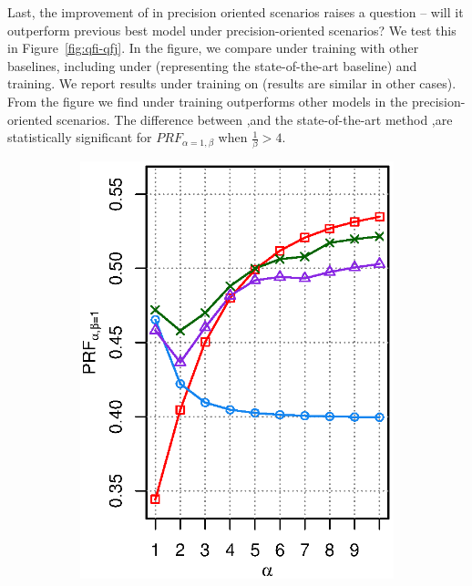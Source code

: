 Last, the improvement of \QFJ in precision oriented scenarios raises a question -- will it outperform previous best model \QFI under precision-oriented scenarios? We test this in Figure~\ref{fig:qfi-qfj}. In the figure, we compare \QFJ under \EUM training with other baselines, including \QFI under \MLE (representing the state-of-the-art baseline) and \EUM training. We report results under  training on \DQF (results are similar in other cases). From the figure we find \QFJ under \EUM training outperforms other models in the precision-oriented scenarios. The difference between \QFJ,\EUM and the state-of-the-art method \QFI,\MLE are statistically significant for $P\!R\!F_{\alpha=1,\beta}$ when $\frac{1}{\beta}>4$.
\begin{figure}[ht!]
\centering
\caption{\PRF performance with different $\alpha$, $\beta$ settings for \QFI and \QFJ under \MLE and \EUM training on \DQF.  run result is reported for \EUM.}
\label{fig:qfi-qfj}
\begin{subfigure}[b]{0.45\columnwidth}
\includegraphics[width=\columnwidth]{figure/qf13-prfa-qfi-qfj.eps}

\end{subfigure}
\end{figure}
